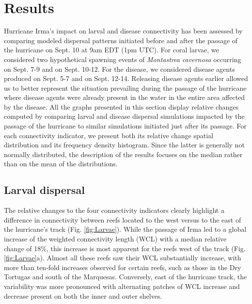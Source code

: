 \documentclass[fleqn,10pt]{wlscirep}
\newcommand{\modif}[1]{{#1}}
\begin{document}
\section{Results}
Hurricane Irma's impact on larval and disease connectivity has been assessed by comparing \modif{modeled} dispersal patterns initiated before and after the passage of the hurricane on Sept. 10 at 9am EDT (1pm UTC). For coral larvae, we considered two hypothetical spawning events of {\it Montastrea cavernosa} occurring on Sept. 7-9 and on Sept. 10-12. For the disease, we considered disease agents produced on Sept. 5-7 and on Sept. 12-14. Releasing disease agents earlier allowed us to better represent the situation prevailing during the passage of the hurricane where disease agents were already present in the water in the entire area affected by the disease. All the graphs presented in this section display relative changes computed by comparing larval and disease dispersal simulations impacted by the passage of the hurricane to similar simulations initiated just after its passage. For each connectivity indicator, we present both its relative change spatial distribution and its frequency density histogram. Since the latter is generally not normally distributed, the description of the results focuses on the median rather than on the mean of the distributions.

\subsection{Larval dispersal}
The relative changes to the four connectivity indicators clearly highlight a difference \modif{in connectivity between reefs located to the west versus to the east of} the hurricane's track (Fig. \ref{fig:Larvae}). While the passage of Irma led to a global increase of the \modif{weighted connectivity length} (WCL) with a median relative change of 18\%, this increase is most apparent for the reefs west of the track (Fig. \ref{fig:Larvae}a). Almost all these reefs saw their WCL substantially increase, with more than ten-fold increases observed for certain reefs, such as those in the Dry Tortugas and south of the Marquesas. Conversely, east of the hurricane track, the variability was more pronounced with alternating patches of WCL increase and decrease present on both the inner and outer shelves.
\end{document}
